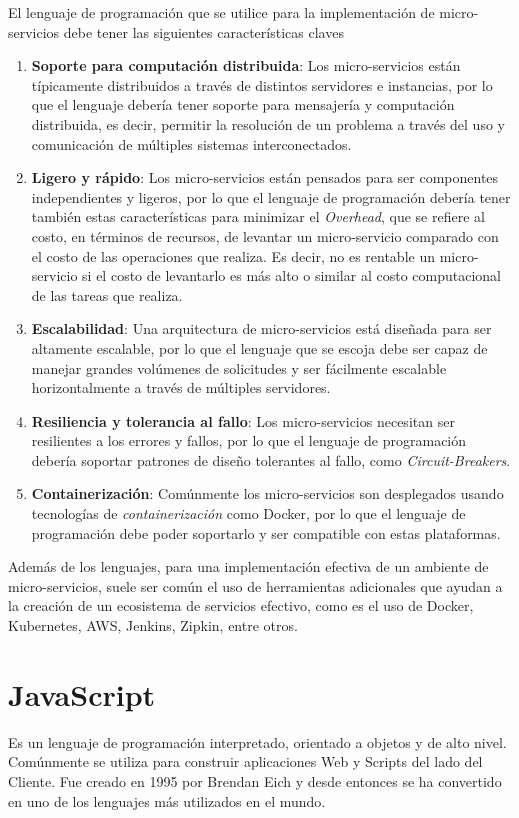     El lenguaje de programación que se utilice para la implementación de micro-servicios debe tener las siguientes características claves

    \begin{enumerate}
        \item \textbf{Soporte para computación distribuida}: Los micro-servicios están típicamente distribuidos a través de distintos servidores e instancias, por lo que el lenguaje debería tener soporte para mensajería y computación distribuida, es decir, permitir la resolución de un problema a través del uso y comunicación de múltiples sistemas interconectados.
        \item \textbf{Ligero y rápido}: Los micro-servicios están pensados para ser componentes independientes y ligeros, por lo que el lenguaje de programación debería tener también estas características para minimizar el \textit{Overhead}, que se refiere al costo, en términos de recursos, de levantar un micro-servicio comparado con el costo de las operaciones que realiza. Es decir, no es rentable un micro-servicio si el costo de levantarlo es más alto o similar al costo computacional de las tareas que realiza.
        \item \textbf{Escalabilidad}: Una arquitectura de micro-servicios está diseñada para ser altamente escalable, por lo que el lenguaje que se escoja debe ser capaz de manejar grandes volúmenes de solicitudes y ser fácilmente escalable horizontalmente a través de múltiples servidores.
        \item \textbf{Resiliencia y tolerancia al fallo}: Los micro-servicios necesitan ser resilientes a los errores y fallos, por lo que el lenguaje de programación debería soportar patrones de diseño tolerantes al fallo, como \textit{Circuit-Breakers}.
        \item \textbf{Containerización}: Comúnmente los micro-servicios son desplegados usando tecnologías de \textit{containerización} como Docker, por lo que el lenguaje de programación debe poder soportarlo y ser compatible con estas plataformas.
    \end{enumerate}

Además de los lenguajes,  para una implementación efectiva de un ambiente de micro-servicios, suele ser común el uso de herramientas adicionales que ayudan a la creación de un ecosistema de servicios efectivo, como es el uso de Docker, Kubernetes, AWS, Jenkins, Zipkin, entre otros.

    \section{JavaScript}
        Es un lenguaje de programación interpretado, orientado a objetos y de alto nivel. Comúnmente se utiliza para construir aplicaciones Web y Scripts del lado del Cliente. Fue creado en 1995 por Brendan Eich y desde entonces se ha convertido en uno de los lenguajes más utilizados en el mundo.


